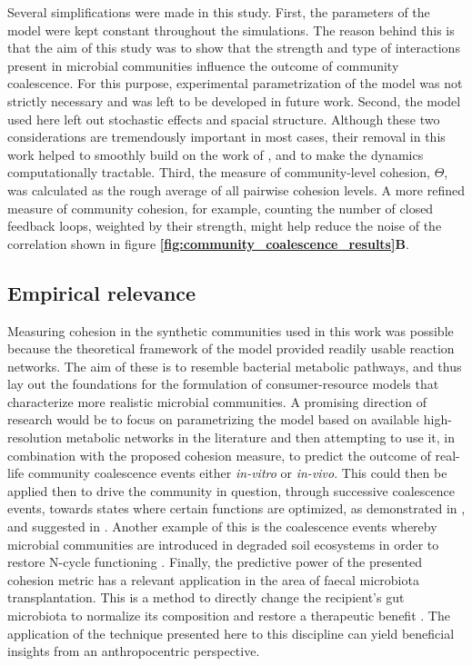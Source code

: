 \documentclass[titlepage,11pt]{article}
\begin{document}
\begin{linenumbers}
\begin{singlespace}
			Several simplifications were made in this study. First, the 	parameters of the model were kept constant throughout the simulations. The reason behind this is that the aim of this study was to show that the strength and type of interactions present in microbial communities influence the outcome of community coalescence. For this purpose, experimental parametrization of the model was not strictly necessary and was left to be developed in future work. Second, the model used here left out stochastic effects and spacial structure. Although these two considerations are tremendously important in most cases, their removal in this work helped to smoothly build on the work of \citet{Tikhonov2016}, and to make the dynamics computationally tractable. Third, the measure of community-level cohesion, $ \Theta $, was calculated as the rough average of all pairwise cohesion levels. A more refined measure of community cohesion, for example, counting the number of closed feedback loops, weighted by their strength,  might help reduce the noise of the correlation shown in figure \textbf{\ref{fig:community_coalescence_results}B}. %
			\subsection{Empirical relevance}
				Measuring cohesion in the synthetic communities used in this work was possible because the theoretical framework of the model provided readily usable reaction networks. The aim of these is to resemble bacterial metabolic pathways, and thus lay out the foundations for the formulation of consumer-resource models that characterize more realistic microbial communities. A promising direction of research would be to focus on parametrizing the model based on available high-resolution metabolic networks in the literature and then attempting to use it, in combination with the proposed cohesion measure, to predict the outcome of real-life community coalescence events either \textit{in-vitro} or \textit{in-vivo}. This could then be applied then to drive the community in question, through successive coalescence events, towards states where certain functions are optimized, as demonstrated in \citet{Sierocinski2017}, and suggested in \citet{Rillig2016}. Another example of this is the coalescence events whereby microbial communities are introduced in degraded soil ecosystems in order to restore N-cycle functioning \citep{Calderon2017}. Finally, the predictive power of the presented cohesion metric has a relevant application in the area of faecal microbiota transplantation. This is a method to directly change the recipient's gut microbiota to normalize its composition and restore a therapeutic benefit \citep{Wang2019, Wilson2019}. The application of the technique presented here to this discipline can yield beneficial insights from an anthropocentric perspective. 

\end{singlespace}
\end{linenumbers}
\end{document}
